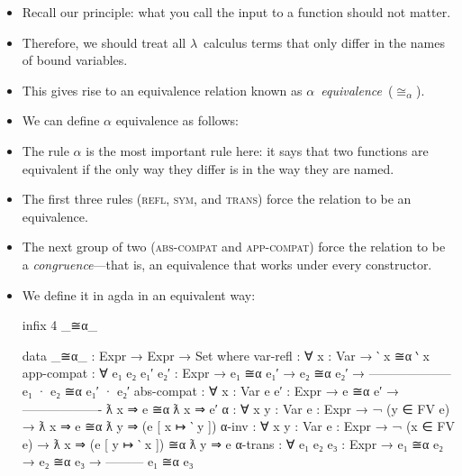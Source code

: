 \documentclass{lecturenotes}
\newcommand{\abs}[2]{\ensuremath{\lambda #1.\,#2}}
\newcommand{\app}[2]{\ensuremath{#1\;#2}}
\newcommand{\FV}{\text{FV}}
\begin{document}
\begin{itemize}
\item Recall our principle: what you call the input to a function should not matter.
\item Therefore, we should treat all $\lambda$~calculus terms that only differ in the names of bound variables.
\item This gives rise to an equivalence relation known as \emph{$\alpha$~equivalence}~($\cong_\alpha$).
\item We can define $\alpha$ equivalence as follows:
\item The rule $\alpha$ is the most important rule here: it says that two functions are equivalent if the only way they differ is in the way they are named.
\item The first three rules (\textsc{refl}, \textsc{sym}, and \textsc{trans}) force the relation to be an equivalence.
\item The next group of two (\textsc{abs-compat} and \textsc{app-compat}) force the relation to be a \emph{congruence}---that is, an equivalence that works under every constructor.
\item We define it in agda in an equivalent way:
\begin{code}
infix 4 _≅α_    

data _≅α_ : Expr → Expr → Set where
  var-refl : ∀ {x : Var} → ‵ x ≅α ‵ x
  app-compat : ∀ {e₁ e₂ e₁′ e₂′ : Expr} →
         e₁ ≅α e₁′ →
         e₂ ≅α e₂′ →
    --------------------
    e₁ · e₂ ≅α e₁′ · e₂′
  abs-compat : ∀ {x : Var} {e e′ : Expr} →
          e ≅α e′ →
    -------------------
    ƛ x ⇒ e ≅α ƛ x ⇒ e′
  α : ∀ {x y : Var} {e : Expr} →
    ¬ (y ∈ FV e) → 
    ƛ x ⇒ e ≅α ƛ y ⇒ (e [ x ↦ ‵ y ])
  α-inv : ∀ {x y : Var} {e : Expr} →
    ¬ (x ∈ FV e) → 
    ƛ x ⇒ (e [ y ↦ ‵ x ]) ≅α ƛ y ⇒ e
  α-trans : ∀ {e₁ e₂ e₃ : Expr} →
    e₁ ≅α e₂ →
    e₂ ≅α e₃ →
    ---------
    e₁ ≅α e₃


\end{code}
\end{itemize}
\end{document}
